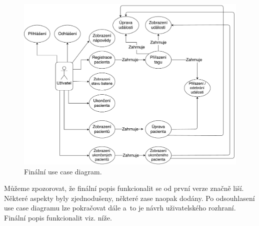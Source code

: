 \begin{figure} [H]
	\centering
	\includegraphics[width=15cm]{../UCDiagram2.pdf}
	\caption{Finální use case diagram.}
	\label{fig:UCDIagram2}
\end{figure}

Můžeme zpozorovat, že finální popis funkcionalit se od první verze značně liší. Některé aspekty byly zjednodušeny, některé zase naopak dodány. Po odsouhlasení use case diagramu lze pokračovat dále a~to je návrh uživatelského rozhraní. Finální popis funkcionalit viz. níže.

